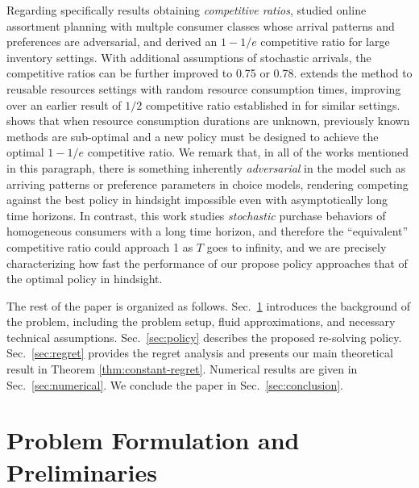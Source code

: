 \documentclass[opre]{informs3aa}
\newcommand{\Authornote}[2]{{\small\textcolor{DSgray}{\sf$<<<${  #1: #2
			}$>>>$}}}
\newcommand{\xnote}[1]{{\Authornote{Xi}{#1}}}
\begin{document}
{
Regarding specifically results obtaining \emph{competitive ratios}, \cite{Golrezaei2014} studied online assortment planning with multple consumer classes whose arrival patterns and preferences are adversarial, and derived an $1-1/e$ competitive ratio for large inventory settings. With additional assumptions of stochastic arrivals, the competitive ratios can be further improved to 0.75 or 0.78. \cite{Gong:19:online} extends the method to reusable resources settings with random resource consumption times,
improving over an earlier result of $1/2$ competitive ratio established in \citep{rusmevichientong2020dynamic} for similar settings.
\cite{goyal2025asymptotically} shows that when resource consumption durations are unknown, previously known methods are sub-optimal
and a new policy must be designed to achieve the optimal $1-1/e$ competitive ratio.
We remark that, in all of the works mentioned in this paragraph, there is something inherently \emph{adversarial} in the model such as arriving patterns or preference parameters in choice models, rendering competing against the best policy in hindsight impossible even with asymptotically long time horizons.
In contrast, this work studies \emph{stochastic} purchase behaviors of homogeneous consumers with a long time horizon,
and therefore the ``equivalent'' competitive ratio could approach 1 as $T$ goes to infinity, and we are precisely characterizing how fast the performance of our propose policy approaches that of the optimal policy in hindsight.
}
 
The rest of the paper is organized as follows. Sec.~\ref{sec:form} introduces the background of the problem, including the problem setup, fluid approximations, and necessary technical assumptions. Sec.~\ref{sec:policy} describes the proposed re-solving policy. Sec.~\ref{sec:regret} provides the regret analysis and presents our main theoretical result in Theorem \ref{thm:constant-regret}. 
Numerical results are given in Sec.~\ref{sec:numerical}. We conclude the paper in Sec.~\ref{sec:conclusion}. 










\section{Problem Formulation and Preliminaries}
\label{sec:form}
\end{document}

